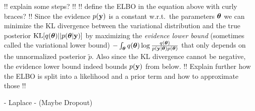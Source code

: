 \documentclass[../thesis.tex]{subfiles}
\begin{document}
!! explain some steps? !!
!! define the ELBO in the equation above with curly braces? !!
Since the evidence $p(\boldsymbol{\mathbf{y}})$ is a constant w.r.t.\ the parameters $\boldsymbol{\mathbf{\theta}}$ we can minimize the KL divergence between the variational distribution and the true posterior $\operatorname{KL}[q(\boldsymbol{\mathbf{\theta}})||p(\boldsymbol{\mathbf{\theta}} | \boldsymbol{\mathbf{y}})]$ by maximizing the \textit{evidence lower bound} (sometimes called the variational lower bound) $-\int_{\boldsymbol{\mathbf{\theta}}} q(\boldsymbol{\mathbf{\theta}}) \log \frac{q(\boldsymbol{\mathbf{\theta}})}{p(\boldsymbol{\mathbf{y}} | \boldsymbol{\mathbf{\theta}}) p(\boldsymbol{\mathbf{\theta}})}$ that only depends on the unnormalized posterior $\tilde{p}$. Also since the KL divergence cannot be negative, the evidence lower bound indeed bounds $p(\boldsymbol{\mathbf{y}})$ from below.
!! Explain further how the ELBO is split into a likelihood and a prior term and how to approximate those !!

- Laplace
- (Maybe Dropout)
\end{document}
